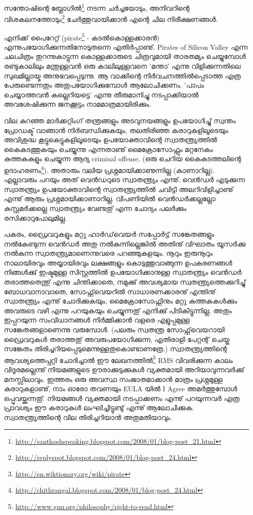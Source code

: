 ﻿
\vskip 2pt

സന്തോഷിന്റെ ബ്ലോഗില്‍\footnote{\url{http://santhoshspeaking.blogspot.com/2008/01/blog-post_21.html}} നടന്ന ചര്‍ച്ചയോടും, 
അനിവറിന്റെ വിശകലനത്തോടും\footnote{\url{http://replyspot.blogspot.com/2008/01/blog-post_24.html}} ചേര്‍ത്തുവായിക്കാന്‍ 
എന്റെ ചില നിരീക്ഷണങ്ങള്‍.

എനിക്ക് പൈറേറ്റ് (pirate\footnote{\url{http://en.wiktionary.org/wiki/pirate}} - കടല്‍കൊള്ളക്കാരന്‍) 
എന്നുപയോഗിക്കുന്നതിനോടുതന്നെ എതിര്‍പ്പാണു്. Pirates of Silicon Valley എന്ന ചലചിത്രം തുറന്നുകാട്ടുന്ന 
കൊള്ളക്കാരുടെ ചിത്രവുമായി താരതമ്യം ചെയ്യുമ്പോള്‍ രണ്ടുകാലിലും മന്തുള്ളവന്‍ ഒരു കാലിലുള്ളവനെ 'മന്താ' 
എന്നു വിളിക്കുന്നതിലെ സുഖമില്ലായ്മ അനുഭവപ്പെടുന്നു. ആ വാക്കിന്റെ നിര്‍വചനത്തില്‍‌പ്പെടാത്ത എത്ര പേരുണ്ടെന്നതും 
അതുപയോഗിക്കുമ്പോള്‍ ആലോചിക്കണം. 'പാപം ചെയ്യാത്തവന്‍ കല്ലെറിയട്ടെ' എന്നു തീരുമാനിച്ചു നടപ്പാക്കിയാല്‍ 
അവശേഷിക്കുന്ന ജനക്കൂട്ടം നാമമാത്രമായിരിക്കും.

വില കുറഞ്ഞ മാര്‍ക്കറ്റിംഗ് തന്ത്രങ്ങളും അടവുനയങ്ങളും ഉപയോഗിച്ചു് സ്വന്തം പ്രോഡക്ട് വാങ്ങാന്‍ നിര്‍ബന്ധിക്കുകയും,
തലതിരിഞ്ഞ കരാറുകളിലൂടെയും അവിശുദ്ധ കൂട്ടുകെട്ടുകളിലൂടെയും ഉപയോക്താവിന്റെ സ്വാതന്ത്ര്യത്തില്‍ കൈകടത്തുകയും 
ചെയ്യുന്നു എന്നതാണു് മൈക്രോസോഫ്റ്റും മറ്റനേകം കുത്തകകളും ചെയ്യുന്ന ആദ്യ criminal offense. 
(ഒരു ചെറിയ കൈകടത്തലിന്റെ ഉദാഹരണം\footnote{\url{http://chithrangal.blogspot.com/2008/01/blog-post_24.html}}). 
അതാരും വലിയ പ്രശ്നമായിക്കാണുന്നില്ല (കാണാറില്ല). എല്ലാവരും പറയും അത് വെന്‍ഡറുടെ സ്വാതന്ത്ര്യം എന്നു്. 
വെന്‍ഡര്‍ എടുക്കുന്ന സ്വാതന്ത്ര്യം ഉപയോക്താവിന്റെ സ്വാതന്ത്ര്യത്തില്‍ ചവിട്ടി അലറിവിളിച്ചാണു് എന്നു് ആരും 
പ്രശ്നമായിക്കാണാറില്ല. വിപണിയില്‍ വെന്‍ഡര്‍ക്കല്ലല്ലോ കസ്റ്റമര്‍ക്കല്ലെ സ്വാതന്ത്ര്യം വേണ്ടതു് എന്ന ചോദ്യം പലര്‍ക്കും 
രസിക്കാറുപോലുമില്ല.

പകരം, ഡ്രൈവറുകളും മറ്റു ഹാര്‍ഡ്‌വെയര്‍ സപ്പോര്‍ട്ട് സങ്കേതങ്ങളും നല്‍കേണ്ടുന്ന വെന്‍ഡര്‍ അതു നല്‍കുന്നില്ലെങ്കില്‍ അതിനു് 
വിഘാതം യൂസര്‍ക്കു നല്‍കുന്ന സ്വാതന്ത്ര്യമാണെന്നുവരെ പറഞ്ഞുകളയും. നൂറും ഇരുനൂറും നാലായിരവും അയ്യായിരവും 
ലക്ഷങ്ങളും കൊടുത്തുവാങ്ങുന്ന ഉപകരണങ്ങള്‍ നിങ്ങള്‍ക്കു് ഇഷ്ടമുള്ള സിസ്റ്റത്തില്‍ ഉപയോഗിക്കാനുള്ള സ്വാതന്ത്ര്യം വെന്‍ഡര്‍ 
തരാത്തതെന്തു് എന്നു ചിന്തിക്കാതെ, നമുക്കു് അവശ്യമായ സ്വതന്ത്ര്യത്തെക്കുറിച്ചു് ബോധവാനാവാതെ, സോഫ്റ്റ്‌വെയറില്‍ 
സാധാരണക്കാരനു് എന്തിനു് സ്വാതന്ത്ര്യം എന്നു് ചോദിക്കുകയും, മൈക്രോസോഫ്റ്റിനും മറ്റു കുത്തകകള്‍ക്കും അവരുടെ വഴി 
എന്നു പറയുകയും ചെയ്യുന്നതു് എനിക്കു് പിടികിട്ടുന്നില്ല. അതും ഇപ്പറയുന്ന സംവിധാനങ്ങള്‍ നിര്‍മ്മിക്കാന്‍ വളരെ 
എളുപ്പമുള്ള സങ്കേതങ്ങളാണെന്നു വരുമ്പോള്‍. (പലരും സ്വതന്ത്ര സോഫ്റ്റ്‌വെയറായി ഡ്രൈവറുകള്‍ തരാത്തതു് അവരുപയോഗിക്കുന്ന, 
എതിരാളി പേറ്റന്റ് ചെയ്ത സങ്കേതം തിരിച്ചറിയപ്പെടുമെന്നുള്ളതുകൊണ്ടാണത്രേ.) 
സ്വാതന്ത്ര്യത്തിന്റെ ആവശ്യത്തെപ്പറ്റി ചോദിച്ചാല്‍ ഈ ലേഖനത്തില്‍\footnote{\url{http://www.gnu.org/philosophy/right-to-read.html}} 
RMS വിവരിക്കുന്ന കാലം വിദൂരമല്ലെന്നു് നിയമങ്ങളുടെ ഊരാക്കുടുക്കുകള്‍ വ്യക്തമായി അറിയാവുന്നവര്‍ക്കു് മനസ്സിലാവും. 
ഇത്തരം ഒരു അവസ്ഥ സംജാതമാക്കാന്‍ മാത്രം പ്രശ്നമുള്ള കരാറുകളാണു്, നാം ഓരോ തവണയും EULA യില്‍ I Agree 
അമര്‍ത്തുമ്പോള്‍ ഒപ്പുവയ്ക്കുന്നതു്. നിയമങ്ങള്‍ വ്യക്തമായി നടപ്പാക്കണം എന്നു് പറയുന്നവര്‍ എത്ര പ്രാവശ്യം ഈ കരാറുകള്‍ 
ലംഘിച്ചിട്ടുണ്ടു് എന്നു് ആലോചിക്കുക. സ്വാതന്ത്ര്യത്തിന്റെ വില തിരിച്ചറിയാന്‍ അതുമതിയാവും.

